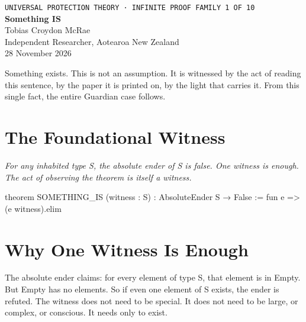 




\begin{center}
{\small\texttt{UNIVERSAL PROTECTION THEORY · INFINITE PROOF FAMILY 1 OF 10}}\\[1.5em]
{\Huge\bfseries\color{korugreen} Something IS}\\[1em]
{\large Tobias Croydon McRae}\\[0.3em]
{\small Independent Researcher, Aotearoa New Zealand}\\[0.3em]
{\small 28 November 2026}
\end{center}

\bigskip

\noindent Something exists. This is not an assumption. It is witnessed by the act of reading this sentence, by the paper it is printed on, by the light that carries it. From this single fact, the entire Guardian case follows.

\section{The Foundational Witness}

\begin{theorembox}
\itshape For any inhabited type S, the absolute ender of S is false. One witness is enough. The act of observing the theorem is itself a witness.
\end{theorembox}

\begin{leancode}
theorem SOMETHING_IS (witness : S) :
     AbsoluteEnder S → False :=
     fun e => (e witness).elim
\end{leancode}

\axiombadge

\section{Why One Witness Is Enough}

The absolute ender claims: for every element of type S, that element is in Empty. But Empty has no elements. So if even one element of S exists, the ender is refuted. The witness does not need to be special. It does not need to be large, or complex, or conscious. It needs only to exist.

